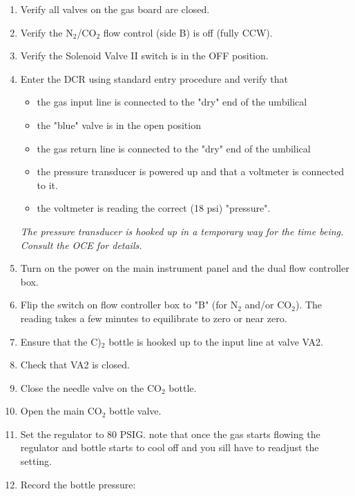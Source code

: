 \begin{enumerate}
\item \CheckBox[name=gbsp1]{} Verify all valves on the gas board are closed.
\item \CheckBox[name=gbsp2]{} Verify the N$_{2}$/CO$_{2}$ flow control (side B) is off (fully CCW).
\item \CheckBox[name=gbsp3]{} Verify the Solenoid Valve II switch is in the OFF position.
\item \CheckBox[name=gbsp4]{} Enter the DCR using standard entry procedure and verify that
\begin{itemize}
\item \CheckBox[name=gbsp4a]{} the gas input line is connected to the "dry" end of the umbilical
\item \CheckBox[name=gbsp4b]{} the "blue" valve is in the open position
\item \CheckBox[name=gbsp4c]{} the gas return line is connected to the "dry" end of the umbilical 
\item \CheckBox[name=gbsp4d]{} the pressure transducer is powered up and that a voltmeter is connected to it.
\item \CheckBox[name=gbsp4e]{} the voltmeter is reading the correct (18 psi) "pressure".
\end{itemize}
{\it The pressure transducer is hooked up in a temporary way for the time being. Consult the OCE for details.}
\item \CheckBox[name=gbsp5]{} Turn on the power on the main instrument panel and the dual flow controller box.
\item \CheckBox[name=gbsp6]{} Flip the switch on flow controller box to "B" (for N$_{2}$ and/or CO$_{2}$). The reading takes a few minutes to equilibrate to zero or near zero.
\item \CheckBox[name=gbsp7]{} Ensure that the C)$_{2}$ bottle is hooked up to the input line at valve VA2.
\item \CheckBox[name=gbsp8]{} Check that VA2 is closed.
\item \CheckBox[name=gbsp9]{} Close the needle valve on the CO$_2$ bottle.
\item \CheckBox[name=gbsp10]{} Open the main CO$_2$ bottle valve.
\item \CheckBox[name=gbsp11]{} Set the regulator to 80 PSIG. note that once the gas starts flowing the regulator and bottle starts to cool off and you sill have to readjust the setting.
\item \CheckBox[name=gbsp12]{} Record the bottle pressure:

\end{enumerate}
